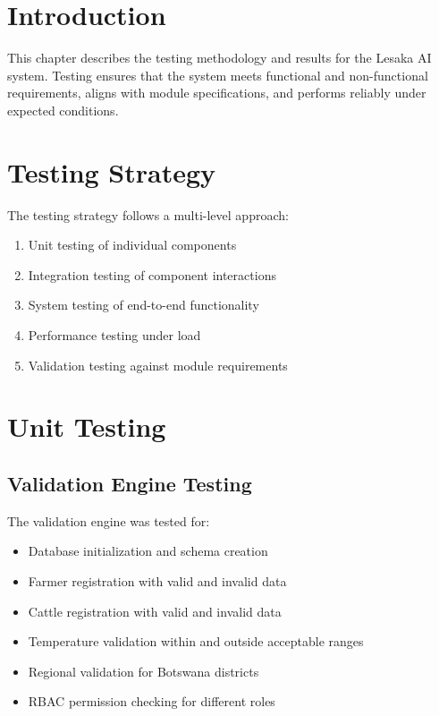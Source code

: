 
\section{Introduction}

This chapter describes the testing methodology and results for the Lesaka AI system. Testing ensures that the system meets functional and non-functional requirements, aligns with module specifications, and performs reliably under expected conditions.

\section{Testing Strategy}

The testing strategy follows a multi-level approach:

\begin{enumerate}
    \item Unit testing of individual components
    \item Integration testing of component interactions
    \item System testing of end-to-end functionality
    \item Performance testing under load
    \item Validation testing against module requirements
\end{enumerate}

\section{Unit Testing}

\subsection{Validation Engine Testing}

The validation engine was tested for:

\begin{itemize}
    \item Database initialization and schema creation
    \item Farmer registration with valid and invalid data
    \item Cattle registration with valid and invalid data
    \item Temperature validation within and outside acceptable ranges
    \item Regional validation for Botswana districts
    \item RBAC permission checking for different roles
\end{itemize}

